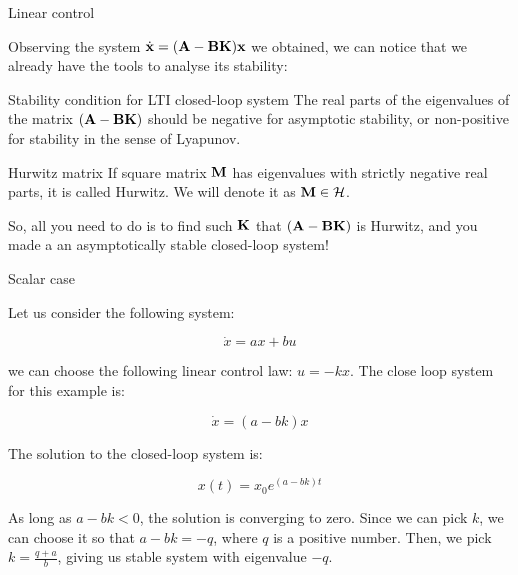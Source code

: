 \documentclass{beamer}
\begin{document}
\begin{frame}{Linear control}
\begin{flushleft}

Observing the system $\dot{\mathbf{x}} = (\mathbf{A} - \mathbf{B}\mathbf{K})\mathbf{x}$ we obtained, we can notice that we already have the tools to analyse its stability:

\begin{block}{Stability condition for LTI closed-loop system}
The real parts of the eigenvalues of the matrix $(\mathbf{A} - \mathbf{B}\mathbf{K})$ should be negative for asymptotic stability, or non-positive for stability in the sense of Lyapunov.
\end{block}

\begin{block}{Hurwitz matrix}
	If square matrix $\mathbf{M}$ has eigenvalues with strictly negative real parts, it is called Hurwitz. We will denote it as $\mathbf{M} \in \mathcal{H}$.
\end{block}


So, all you need to do is to find such $\mathbf{K}$ that $(\mathbf{A} - \mathbf{B}\mathbf{K})$ is Hurwitz, and you made a an asymptotically stable closed-loop system!

\end{flushleft}
\end{frame}




\begin{frame}{Scalar case}
	\begin{flushleft}
		
		Let us consider the following system:
		
		\begin{equation}
			\dot x = a x + b u
		\end{equation}
	
		we can choose the following linear control law: $u = - k x$. The close loop system for this example is:
		
		\begin{equation}
			\dot x = (a- bk) x
		\end{equation}		
	
		The solution to the closed-loop system is:
		
		\begin{equation}
			x(t) =  x_0 e^{(a- bk)t}
		\end{equation}		
		
		As long as $a- bk < 0$, the solution is converging to zero. Since we can pick $k$, we can choose it so that $a- bk = -q$, where $q$ is a positive number. Then, we pick $k = \frac{q+a}{b}$, giving us stable system with eigenvalue $-q$.
		
	\end{flushleft}
\end{frame}
\end{document}
